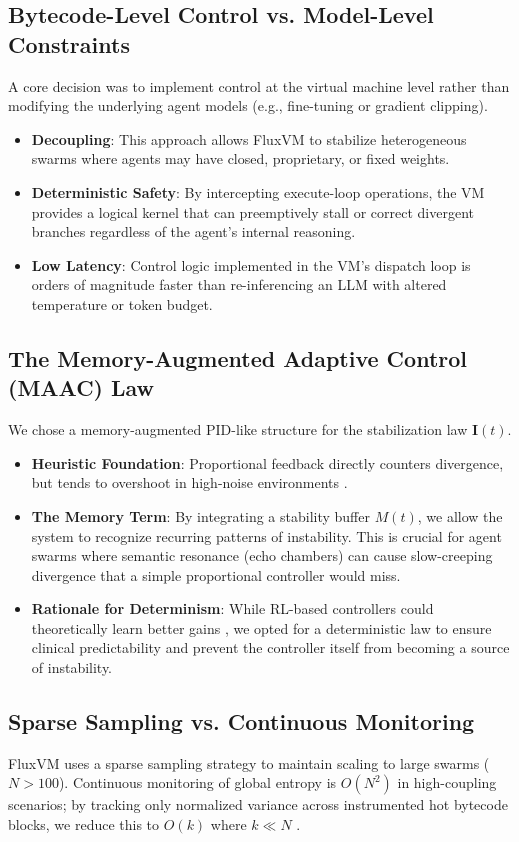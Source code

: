 \documentclass{article}
\begin{document}
\subsection{Bytecode-Level Control vs. Model-Level Constraints}
A core decision was to implement control at the virtual machine level rather than modifying the underlying agent models (e.g., fine-tuning or gradient clipping).
\begin{itemize}
    \item \textbf{Decoupling}: This approach allows FluxVM to stabilize heterogeneous swarms where agents may have closed, proprietary, or fixed weights.
    \item \textbf{Deterministic Safety}: By intercepting execute-loop operations, the VM provides a logical kernel that can preemptively stall or correct divergent branches regardless of the agent's internal reasoning.
    \item \textbf{Low Latency}: Control logic implemented in the VM's dispatch loop is orders of magnitude faster than re-inferencing an LLM with altered temperature or token budget.
\end{itemize}

\subsection{The Memory-Augmented Adaptive Control (MAAC) Law}
We chose a memory-augmented PID-like structure for the stabilization law $\mathbf{I}(t)$.
\begin{itemize}
    \item \textbf{Heuristic Foundation}: Proportional feedback directly counters divergence, but tends to overshoot in high-noise environments \cite{astrom2010feedback}.
    \item \textbf{The Memory Term}: By integrating a stability buffer $M(t)$, we allow the system to recognize recurring patterns of instability. This is crucial for agent swarms where semantic resonance (echo chambers) can cause slow-creeping divergence that a simple proportional controller would miss.
    \item \textbf{Rationale for Determinism}: While RL-based controllers could theoretically learn better gains \cite{sutton2018reinforcement}, we opted for a deterministic law to ensure clinical predictability and prevent the controller itself from becoming a source of instability.
\end{itemize}

\subsection{Sparse Sampling vs. Continuous Monitoring}
FluxVM uses a sparse sampling strategy to maintain scaling to large swarms ($N > 100$). Continuous monitoring of global entropy is $O(N^2)$ in high-coupling scenarios; by tracking only normalized variance across instrumented hot bytecode blocks, we reduce this to $O(k)$ where $k \ll N$ \cite{tanenbaum2017distributed}.
\end{document}
